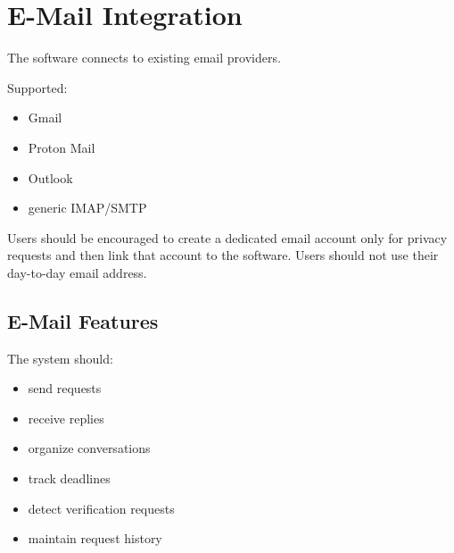
\chapter{E-Mail Integration}

The software connects to existing email providers.

Supported:
\begin{itemize}
	\item Gmail
	\item Proton Mail
	\item Outlook
	\item generic IMAP/SMTP
\end{itemize}
Users should be encouraged to create a dedicated email account only for privacy requests and then link that account to the software. Users should not use their day-to-day email address.

\section{E-Mail Features}
The system should:
\begin{itemize}
	\item send requests
	\item receive replies
	\item organize conversations
	\item track deadlines
	\item detect verification requests
	\item maintain request history
\end{itemize}


\sentinelchapterend
